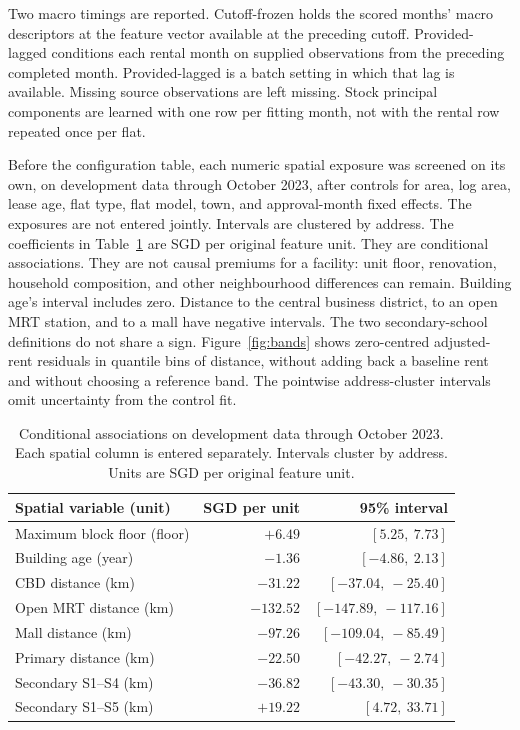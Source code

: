 \documentclass[11pt,a4paper]{article}
\begin{document}
Two macro timings are reported.
Cutoff-frozen holds the scored months' macro descriptors at the feature vector available at the preceding cutoff.
Provided-lagged conditions each rental month on supplied observations from the preceding completed month.
Provided-lagged is a batch setting in which that lag is available.
Missing source observations are left missing.
Stock principal components are learned with one row per fitting month, not with the rental row repeated once per flat.

Before the configuration table, each numeric spatial exposure was screened on its own, on development data through October 2023, after controls for area, log area, lease age, flat type, flat model, town, and approval-month fixed effects.
The exposures are not entered jointly.
Intervals are clustered by address.
The coefficients in Table~\ref{tab:assoc} are SGD per original feature unit.
They are conditional associations.
They are not causal premiums for a facility: unit floor, renovation, household composition, and other neighbourhood differences can remain.
Building age's interval includes zero.
Distance to the central business district, to an open MRT station, and to a mall have negative intervals.
The two secondary-school definitions do not share a sign.
Figure~\ref{fig:bands} shows zero-centred adjusted-rent residuals in quantile bins of distance, without adding back a baseline rent and without choosing a reference band.
The pointwise address-cluster intervals omit uncertainty from the control fit.

\begin{table}[htbp]
\centering
\caption{Conditional associations on development data through October 2023.
Each spatial column is entered separately.
Intervals cluster by address.
Units are SGD per original feature unit.}
\label{tab:assoc}
\small
\begin{tabular}{lrr}
\toprule
Spatial variable (unit) & SGD per unit & 95\% interval \\
\midrule
Maximum block floor (floor) & $+6.49$ & $[5.25,\ 7.73]$ \\
Building age (year) & $-1.36$ & $[-4.86,\ 2.13]$ \\
CBD distance (km) & $-31.22$ & $[-37.04,\ -25.40]$ \\
Open MRT distance (km) & $-132.52$ & $[-147.89,\ -117.16]$ \\
Mall distance (km) & $-97.26$ & $[-109.04,\ -85.49]$ \\
Primary distance (km) & $-22.50$ & $[-42.27,\ -2.74]$ \\
Secondary S1--S4 (km) & $-36.82$ & $[-43.30,\ -30.35]$ \\
Secondary S1--S5 (km) & $+19.22$ & $[4.72,\ 33.71]$ \\
\bottomrule
\end{tabular}
\end{table}
\end{document}
